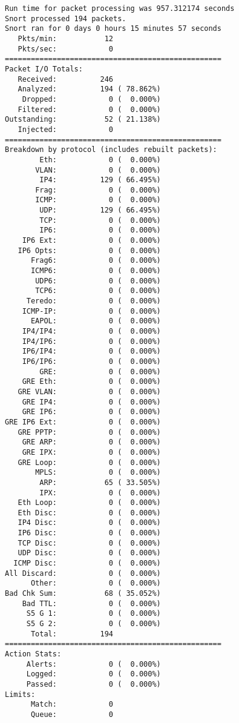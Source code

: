 \documentclass[titlepage]{article}
\begin{document}
\begin{lstlisting}
Run time for packet processing was 957.312174 seconds
Snort processed 194 packets.
Snort ran for 0 days 0 hours 15 minutes 57 seconds
   Pkts/min:           12
   Pkts/sec:            0
==================================================
Packet I/O Totals:
   Received:          246
   Analyzed:          194 ( 78.862%)
    Dropped:            0 (  0.000%)
   Filtered:            0 (  0.000%)
Outstanding:           52 ( 21.138%)
   Injected:            0
==================================================
Breakdown by protocol (includes rebuilt packets):
        Eth:            0 (  0.000%)
       VLAN:            0 (  0.000%)
        IP4:          129 ( 66.495%)
       Frag:            0 (  0.000%)
       ICMP:            0 (  0.000%)
        UDP:          129 ( 66.495%)
        TCP:            0 (  0.000%)
        IP6:            0 (  0.000%)
    IP6 Ext:            0 (  0.000%)
   IP6 Opts:            0 (  0.000%)
      Frag6:            0 (  0.000%)
      ICMP6:            0 (  0.000%)
       UDP6:            0 (  0.000%)
       TCP6:            0 (  0.000%)
     Teredo:            0 (  0.000%)
    ICMP-IP:            0 (  0.000%)
      EAPOL:            0 (  0.000%)
    IP4/IP4:            0 (  0.000%)
    IP4/IP6:            0 (  0.000%)
    IP6/IP4:            0 (  0.000%)
    IP6/IP6:            0 (  0.000%)
        GRE:            0 (  0.000%)
    GRE Eth:            0 (  0.000%)
   GRE VLAN:            0 (  0.000%)
    GRE IP4:            0 (  0.000%)
    GRE IP6:            0 (  0.000%)
GRE IP6 Ext:            0 (  0.000%)
   GRE PPTP:            0 (  0.000%)
    GRE ARP:            0 (  0.000%)
    GRE IPX:            0 (  0.000%)
   GRE Loop:            0 (  0.000%)
       MPLS:            0 (  0.000%)
        ARP:           65 ( 33.505%)
        IPX:            0 (  0.000%)
   Eth Loop:            0 (  0.000%)
   Eth Disc:            0 (  0.000%)
   IP4 Disc:            0 (  0.000%)
   IP6 Disc:            0 (  0.000%)
   TCP Disc:            0 (  0.000%)
   UDP Disc:            0 (  0.000%)
  ICMP Disc:            0 (  0.000%)
All Discard:            0 (  0.000%)
      Other:            0 (  0.000%)
Bad Chk Sum:           68 ( 35.052%)
    Bad TTL:            0 (  0.000%)
     S5 G 1:            0 (  0.000%)
     S5 G 2:            0 (  0.000%)
      Total:          194
==================================================
Action Stats:
     Alerts:            0 (  0.000%)
     Logged:            0 (  0.000%)
     Passed:            0 (  0.000%)
Limits:
      Match:            0
      Queue:            0

\end{lstlisting}
\end{document}
